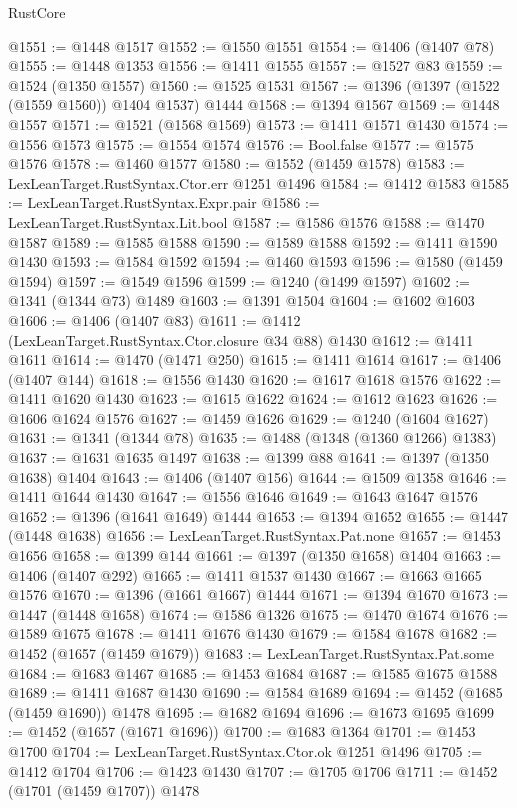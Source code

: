 \begin{lexlean}{RustCore}
\begin{coremodule}
@1551 := @1448 @1517
@1552 := @1550 @1551
@1554 := @1406 (@1407 @78)
@1555 := @1448 @1353
@1556 := @1411 @1555
@1557 := @1527 @83
@1559 := @1524 (@1350 @1557)
@1560 := @1525 @1531
@1567 := @1396 (@1397 (@1522 (@1559 @1560)) @1404 @1537) @1444
@1568 := @1394 @1567
@1569 := @1448 @1557
@1571 := @1521 (@1568 @1569)
@1573 := @1411 @1571 @1430
@1574 := @1556 @1573
@1575 := @1554 @1574
@1576 := Bool.false
@1577 := @1575 @1576
@1578 := @1460 @1577
@1580 := @1552 (@1459 @1578)
@1583 := LexLeanTarget.RustSyntax.Ctor.err @1251 @1496
@1584 := @1412 @1583
@1585 := LexLeanTarget.RustSyntax.Expr.pair
@1586 := LexLeanTarget.RustSyntax.Lit.bool
@1587 := @1586 @1576
@1588 := @1470 @1587
@1589 := @1585 @1588
@1590 := @1589 @1588
@1592 := @1411 @1590 @1430
@1593 := @1584 @1592
@1594 := @1460 @1593
@1596 := @1580 (@1459 @1594)
@1597 := @1549 @1596
@1599 := @1240 (@1499 @1597)
@1602 := @1341 (@1344 @73) @1489
@1603 := @1391 @1504
@1604 := @1602 @1603
@1606 := @1406 (@1407 @83)
@1611 := @1412 (LexLeanTarget.RustSyntax.Ctor.closure @34 @88) @1430
@1612 := @1411 @1611
@1614 := @1470 (@1471 @250)
@1615 := @1411 @1614
@1617 := @1406 (@1407 @144)
@1618 := @1556 @1430
@1620 := @1617 @1618 @1576
@1622 := @1411 @1620 @1430
@1623 := @1615 @1622
@1624 := @1612 @1623
@1626 := @1606 @1624 @1576
@1627 := @1459 @1626
@1629 := @1240 (@1604 @1627)
@1631 := @1341 (@1344 @78)
@1635 := @1488 (@1348 (@1360 @1266) @1383)
@1637 := @1631 @1635 @1497
@1638 := @1399 @88
@1641 := @1397 (@1350 @1638) @1404
@1643 := @1406 (@1407 @156)
@1644 := @1509 @1358
@1646 := @1411 @1644 @1430
@1647 := @1556 @1646
@1649 := @1643 @1647 @1576
@1652 := @1396 (@1641 @1649) @1444
@1653 := @1394 @1652
@1655 := @1447 (@1448 @1638)
@1656 := LexLeanTarget.RustSyntax.Pat.none
@1657 := @1453 @1656
@1658 := @1399 @144
@1661 := @1397 (@1350 @1658) @1404
@1663 := @1406 (@1407 @292)
@1665 := @1411 @1537 @1430
@1667 := @1663 @1665 @1576
@1670 := @1396 (@1661 @1667) @1444
@1671 := @1394 @1670
@1673 := @1447 (@1448 @1658)
@1674 := @1586 @1326
@1675 := @1470 @1674
@1676 := @1589 @1675
@1678 := @1411 @1676 @1430
@1679 := @1584 @1678
@1682 := @1452 (@1657 (@1459 @1679))
@1683 := LexLeanTarget.RustSyntax.Pat.some
@1684 := @1683 @1467
@1685 := @1453 @1684
@1687 := @1585 @1675 @1588
@1689 := @1411 @1687 @1430
@1690 := @1584 @1689
@1694 := @1452 (@1685 (@1459 @1690)) @1478
@1695 := @1682 @1694
@1696 := @1673 @1695
@1699 := @1452 (@1657 (@1671 @1696))
@1700 := @1683 @1364
@1701 := @1453 @1700
@1704 := LexLeanTarget.RustSyntax.Ctor.ok @1251 @1496
@1705 := @1412 @1704
@1706 := @1423 @1430
@1707 := @1705 @1706
@1711 := @1452 (@1701 (@1459 @1707)) @1478

\end{coremodule}
\end{lexlean}
